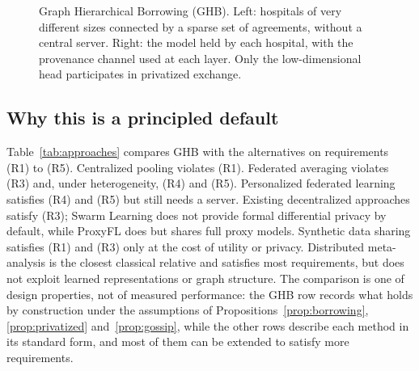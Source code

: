 \documentclass[acmsmall,screen,review]{acmart}
\theoremstyle{acmdefinition}
\begin{document}
\begin{figure}[t]
\caption{Graph Hierarchical Borrowing (GHB). Left: hospitals of very different sizes connected by a sparse set of agreements, without a central server. Right: the model held by each hospital, with the provenance channel used at each layer. Only the low-dimensional head participates in privatized exchange.}
\label{fig:ghb}
\end{figure}


\subsection{Why this is a principled default}\label{sec:S8_6}

Table~\ref{tab:approaches} compares GHB with the alternatives on requirements (R1) to (R5). Centralized pooling violates (R1). Federated averaging violates (R3) and, under heterogeneity, (R4) and (R5). Personalized federated learning satisfies (R4) and (R5) but still needs a server. Existing decentralized approaches satisfy (R3); Swarm Learning does not provide formal differential privacy by default, while ProxyFL does but shares full proxy models. Synthetic data sharing satisfies (R1) and (R3) only at the cost of utility or privacy. Distributed meta-analysis is the closest classical relative and satisfies most requirements, but does not exploit learned representations or graph structure. The comparison is one of design properties, not of measured performance: the GHB row records what holds by construction under the assumptions of Propositions~\ref{prop:borrowing}, \ref{prop:privatized} and~\ref{prop:gossip}, while the other rows describe each method in its standard form, and most of them can be extended to satisfy more requirements.
\end{document}

